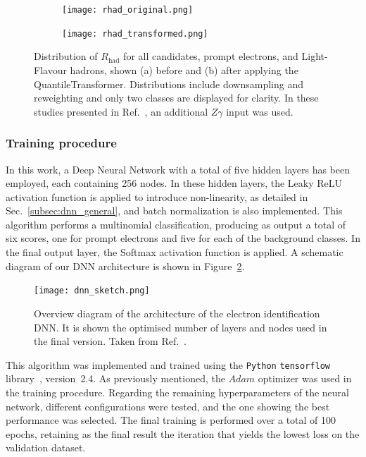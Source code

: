 \begin{figure}[htbp]
  \centering
  \begin{subfigure}[b]{0.45\textwidth}
      \texttt{[image: rhad\_original.png]}
      \caption{}
  \end{subfigure}
  \hfill
  \begin{subfigure}[b]{0.45\textwidth}
      \texttt{[image: rhad\_transformed.png]}
      \caption{}
  \end{subfigure}
  \hfill
  \caption{Distribution of $R_{\text{had}}$ for all candidates, prompt electrons, and Light-Flavour hadrons, shown (a) before and (b) after applying the QuantileTransformer. Distributions include downsampling and reweighting and only two classes are displayed for clarity. In these studies presented in Ref.~\cite{dnn_paper}, an additional $Z\gamma$ input was used.}
  \label{fig:transformed}
\end{figure}

\subsubsection{Training procedure}

In this work, a Deep Neural Network with a total of five hidden layers has been employed, each containing 256 nodes. In these hidden layers, the Leaky ReLU activation function is applied to introduce non-linearity, as detailed in Sec.~\ref{subsec:dnn_general}, and batch normalization is also implemented.  
This algorithm performs a multinomial classification, producing as output a total of six scores, one for prompt electrons and five for each of the background classes. In the final output layer, the Softmax activation function is applied.  
A schematic diagram of our DNN architecture is shown in Figure~\ref{dnn_sketch}.

\begin{figure}[htbp]
  \centering
  \texttt{[image: dnn\_sketch.png]}
  \caption{Overview diagram of the architecture of the electron identification DNN. It is shown the optimised number of layers and nodes used in the final version. Taken from Ref.~\cite{dnn_paper}.}
  \label{dnn_sketch}
\end{figure}

This algorithm was implemented and trained using the \texttt{Python} \texttt{tensorflow} library~\cite{tensorflow2015}, version~2.4. As previously mentioned, the $Adam$ optimizer was used in the training procedure. Regarding the remaining hyperparameters of the neural network, different configurations were tested, and the one showing the best performance was selected.  
The final training is performed over a total of 100 epochs, retaining as the final result the iteration that yields the lowest loss on the validation dataset.

